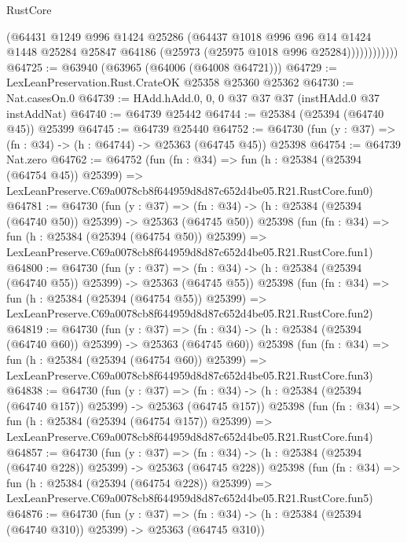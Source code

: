 \begin{lexlean}{RustCore}
\begin{coremodule}
                    (@64431
                      @1249
                      @996
                      @1424
                      @25286
                      (@64437
                        @1018
                        @996
                        @96
                        @14
                        @1424
                        @1448
                        @25284
                        @25847
                        @64186
                        (@25973 (@25975 @1018 @996 @25284))))))))))))
@64725 := @63940 (@63965 (@64006 (@64008 @64721)))
@64729 := LexLeanPreservation.Rust.CrateOK @25358 @25360 @25362
@64730 := Nat.casesOn.{0}
@64739 := HAdd.hAdd.{0, 0, 0} @37 @37 @37 (instHAdd.{0} @37 instAddNat)
@64740 := @64739 @25442
@64744 := @25384 (@25394 (@64740 @45)) @25399
@64745 := @64739 @25440
@64752 := @64730 (fun (y : @37) => (fn : @34) -> (h : @64744) -> @25363 (@64745 @45)) @25398
@64754 := @64739 Nat.zero
@64762 := @64752
    (fun (fn : @34) =>
    fun (h : @25384 (@25394 (@64754 @45)) @25399) =>
    LexLeanPreserve.C69a0078cb8f644959d8d87c652d4be05.R21.RustCore.fun0)
@64781 := @64730
    (fun (y : @37) =>
    (fn : @34) -> (h : @25384 (@25394 (@64740 @50)) @25399) -> @25363 (@64745 @50))
    @25398
    (fun (fn : @34) =>
    fun (h : @25384 (@25394 (@64754 @50)) @25399) =>
    LexLeanPreserve.C69a0078cb8f644959d8d87c652d4be05.R21.RustCore.fun1)
@64800 := @64730
    (fun (y : @37) =>
    (fn : @34) -> (h : @25384 (@25394 (@64740 @55)) @25399) -> @25363 (@64745 @55))
    @25398
    (fun (fn : @34) =>
    fun (h : @25384 (@25394 (@64754 @55)) @25399) =>
    LexLeanPreserve.C69a0078cb8f644959d8d87c652d4be05.R21.RustCore.fun2)
@64819 := @64730
    (fun (y : @37) =>
    (fn : @34) -> (h : @25384 (@25394 (@64740 @60)) @25399) -> @25363 (@64745 @60))
    @25398
    (fun (fn : @34) =>
    fun (h : @25384 (@25394 (@64754 @60)) @25399) =>
    LexLeanPreserve.C69a0078cb8f644959d8d87c652d4be05.R21.RustCore.fun3)
@64838 := @64730
    (fun (y : @37) =>
    (fn : @34) -> (h : @25384 (@25394 (@64740 @157)) @25399) -> @25363 (@64745 @157))
    @25398
    (fun (fn : @34) =>
    fun (h : @25384 (@25394 (@64754 @157)) @25399) =>
    LexLeanPreserve.C69a0078cb8f644959d8d87c652d4be05.R21.RustCore.fun4)
@64857 := @64730
    (fun (y : @37) =>
    (fn : @34) -> (h : @25384 (@25394 (@64740 @228)) @25399) -> @25363 (@64745 @228))
    @25398
    (fun (fn : @34) =>
    fun (h : @25384 (@25394 (@64754 @228)) @25399) =>
    LexLeanPreserve.C69a0078cb8f644959d8d87c652d4be05.R21.RustCore.fun5)
@64876 := @64730
    (fun (y : @37) =>
    (fn : @34) -> (h : @25384 (@25394 (@64740 @310)) @25399) -> @25363 (@64745 @310))

\end{coremodule}
\end{lexlean}
